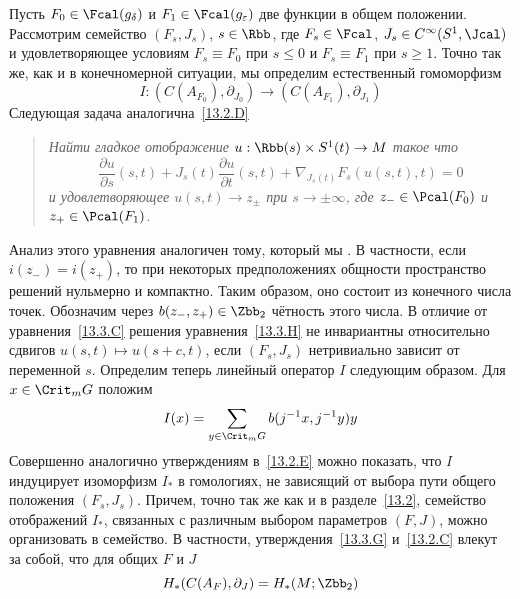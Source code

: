 Пусть $F_{0}\in\Fcal(g_{\delta})$ и $F_{1}\in\Fcal(g_{\epsilon})$ две
функции в общем положении. 
Рассмотрим семейство $(F_{s}, J_{s})$, $s\in\Rbb$, где
$F_{s}\in\Fcal$, $J_{s}\in C^{\infty}(S^{1},\Jcal)$ и удовлетворяющее
условиям 
$F_{s}\equiv F_{0}$ при $s\leq0$ и $F_{s}\equiv F_{1}$ при $s\geq1$.
Точно так же, как и в конечномерной ситуации, мы определим
естественный гомоморфизм
\[
I:(C(A_{F_{0}}),\partial_{J_{0}})\to(C(A_{F_{1}}),\partial_{J_{1}})
\]
Следующая задача аналогична~\ref{13.2.D}
\begin{quote}\em
  Найти гладкое отображение $u:\Rbb(s)\times S^{1}(t)\to M$
  такое что 
  \begin{equation}\label{13.3.H}
    \frac{\partial u}{\partial s}(s,t)+
    J_{s}(t)\frac{\partial u}{\partial t}(s,t) +
    \nabla_{J_{s}(t)}F_{s}(u(s,t),t) = 0
  \end{equation}
  и удовлетворяющее $u(s,t)\to z_{\pm}$ при $s\to\pm\infty$, где
  $z_{-}\in\Pcal(F_{0})$ и $z_{+}\in\Pcal(F_{1})$.
\end{quote}
Анализ этого уравнения аналогичен тому, который мы .
В частности, если $i(z_{-})=i(z_{+})$, то при некоторых предположениях
общности пространство решений нульмерно и компактно. 
Таким образом, оно состоит из конечного числа точек.
Обозначим через $b(z_{-},z_{+})\in\Zbb_{2}$ чётность этого числа.
В отличие от уравнения~\ref{13.3.C} решения
уравнения~\ref{13.3.H} не инвариантны относительно сдвигов
$u(s,t)\mapsto u(s+c,t)$, если $(F_{s}, J_{s})$ нетривиально зависит
от переменной $s$.
Определим теперь линейный оператор $I$ следующим образом.
Для $x\in\Crit_{m}G$ положим
\[
I(x) = \sum_{y\in\Crit_{m}G}b(j^{-1}x,j^{-1}y)y
\]
Совершенно аналогично утверждениям в~\ref{13.2.E} можно показать, что
$I$ индуцирует изоморфизм $I_{*}$ в гомологиях, не зависящий от выбора
пути общего положения $(F_{s}, J_{s})$. 
Причем, точно так же как и в разделе~\ref{13.2}, семейство отображений
$I_{*}$, связанных с различным выбором параметров $(F,J)$, можно
организовать в  семейство.
В частности, утверждения~\ref{13.3.G} и~\ref{13.2.C} влекут за собой,
что для общих $F$ и $J$
\[
H_{*}(C(A_{F}),\partial_{J}) = H_{*}(M;\Zbb_{2})
\]

